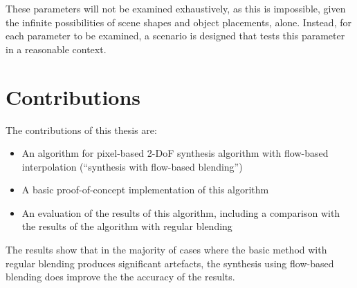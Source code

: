\noindent
These parameters will not be examined exhaustively, as this is impossible, given the infinite possibilities of scene shapes and object placements, alone. Instead, for each parameter to be examined, a scenario is designed that tests this parameter in a reasonable context.


%
%
%
%


\section*{Contributions}
The contributions of this thesis are:
\begin{itemize}
  \item An algorithm for pixel-based 2-DoF synthesis algorithm with flow-based interpolation (``synthesis with flow-based blending'')
  \item A basic proof-of-concept implementation of this algorithm
  \item An evaluation of the results of this algorithm, including a comparison with the results of the algorithm with regular blending
\end{itemize}

\noindent
The results show that in the majority of cases where the basic method with regular blending produces significant artefacts, the synthesis using flow-based blending does improve the the accuracy of the results. 

